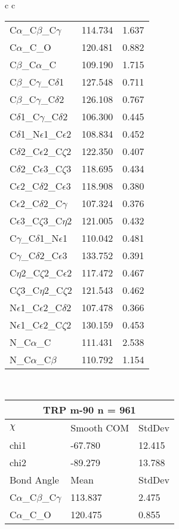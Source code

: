 \begin{longtable}{ c c }
\begin{tabular}{ l l l }
  C$\alpha$\_C$\beta$\_C$\gamma$ & 114.734 & 1.637\\
  C$\alpha$\_C\_O & 120.481 & 0.882\\
  C$\beta$\_C$\alpha$\_C & 109.190 & 1.715\\
  C$\beta$\_C$\gamma$\_C$\delta$1 & 127.548 & 0.711\\
  C$\beta$\_C$\gamma$\_C$\delta$2 & 126.108 & 0.767\\
  C$\delta$1\_C$\gamma$\_C$\delta$2 & 106.300 & 0.445\\
  C$\delta$1\_N$\epsilon$1\_C$\epsilon$2 & 108.834 & 0.452\\
  C$\delta$2\_C$\epsilon$2\_C$\zeta$2 & 122.350 & 0.407\\
  C$\delta$2\_C$\epsilon$3\_C$\zeta$3 & 118.695 & 0.434\\
  C$\epsilon$2\_C$\delta$2\_C$\epsilon$3 & 118.908 & 0.380\\
  C$\epsilon$2\_C$\delta$2\_C$\gamma$ & 107.324 & 0.376\\
  C$\epsilon$3\_C$\zeta$3\_C$\eta$2 & 121.005 & 0.432\\
  C$\gamma$\_C$\delta$1\_N$\epsilon$1 & 110.042 & 0.481\\
  C$\gamma$\_C$\delta$2\_C$\epsilon$3 & 133.752 & 0.391\\
  C$\eta$2\_C$\zeta$2\_C$\epsilon$2 & 117.472 & 0.467\\
  C$\zeta$3\_C$\eta$2\_C$\zeta$2 & 121.543 & 0.462\\
  N$\epsilon$1\_C$\epsilon$2\_C$\delta$2 & 107.478 & 0.366\\
  N$\epsilon$1\_C$\epsilon$2\_C$\zeta$2 & 130.159 & 0.453\\
  N\_C$\alpha$\_C & 111.431 & 2.538\\
  N\_C$\alpha$\_C$\beta$ & 110.792 & 1.154\\
  \bottomrule
  \end{tabular}
  \\
  \begin{tabular}{ l l l }
  \toprule
  \multicolumn{3}{c}{TRP \textbf{m-90} n = 961} \\ \toprule
  $\chi$       & Smooth COM & StdDev \\ \midrule
  chi1 & -67.780 & 12.415 \\ 
  chi2 & -89.279 & 13.788 \\ \midrule
  Bond Angle   & Mean     & StdDev \\ \midrule
  C$\alpha$\_C$\beta$\_C$\gamma$ & 113.837 & 2.475\\
  C$\alpha$\_C\_O & 120.475 & 0.855\\

\end{tabular}
\end{longtable}
